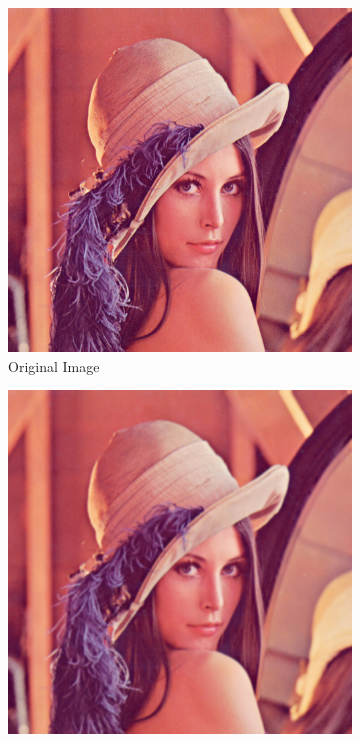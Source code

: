 \begin{figure}[ht]
	\caption[Gaussian Blurring]{512x512px ``Lena''(a) with a 1px (b) and 5px (c) Gaussian blur applied. 
	Gaussian blurring is accomplished by convolving an image with a Gaussian kernel and is commonly used
	in image processing to reduce noise prior to edge detection.
	\label{fig:LenaBlur}}
	\centering
	\begin{subfigure}[b]{0.3\textwidth}
                \includegraphics[scale=0.25]{diagrams/Lenna}
                \caption{Original Image}
       \end{subfigure}
       \begin{subfigure}[b]{0.3\textwidth}
                \includegraphics[scale=0.25]{diagrams/Lenna-blur1}

\end{subfigure}
\end{figure}
